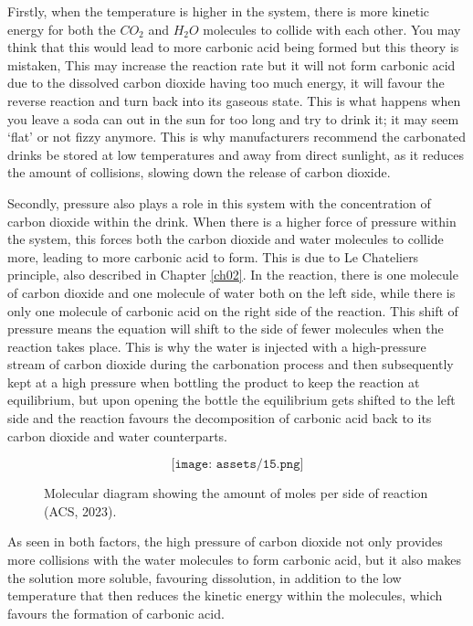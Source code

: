 Firstly, when the temperature is higher in the system, there is more kinetic energy for both the \begin{math}CO_{2}\end{math} and \begin{math}H_{2}O\end{math} molecules to collide with each other. You may think that this would lead to more carbonic acid being formed but this theory is mistaken, This may increase the reaction rate but it will not form carbonic acid due to the dissolved carbon dioxide having too much energy, it will favour the reverse reaction and turn back into its gaseous state. This is what happens when you leave a soda can out in the sun for too long and try to drink it; it may seem ‘flat’ or not fizzy anymore. This is why manufacturers recommend the carbonated drinks be stored at low temperatures and away from direct sunlight, as it reduces the amount of collisions, slowing down the release of carbon dioxide.

Secondly, pressure also plays a role in this system with the concentration of carbon dioxide within the drink. When there is a higher force of pressure within the system, this forces both the carbon dioxide and water molecules to collide more, leading to more carbonic acid to form. This is due to Le Chateliers principle, also described in Chapter \ref{ch02}. In the reaction, there is one molecule of carbon dioxide and one molecule of water both on the left side, while there is only one molecule of carbonic acid on the right side of the reaction. This shift of pressure means the equation will shift to the side of fewer molecules when the reaction takes place. 
This is why the water is injected with a high-pressure stream of carbon dioxide during the carbonation process and then subsequently kept at a high pressure when bottling the product to keep the reaction at equilibrium, but upon opening the bottle the equilibrium gets shifted to the left side and the reaction favours the decomposition of carbonic acid back to its carbon dioxide and water counterparts.
\begin{figure}[htp]
    \centering
    \[
        \texttt{[image: assets/15.png]}
    \]
    \caption{Molecular diagram showing the amount of moles per side of reaction (ACS, 2023).}
    \label{fig:enter-label}
\end{figure}

As seen in both factors, the high pressure of carbon dioxide not only provides more collisions with the water molecules to form carbonic acid, but it also makes the solution more soluble, favouring dissolution, in addition to the low temperature that then reduces the kinetic energy within the molecules, which favours the formation of carbonic acid.
